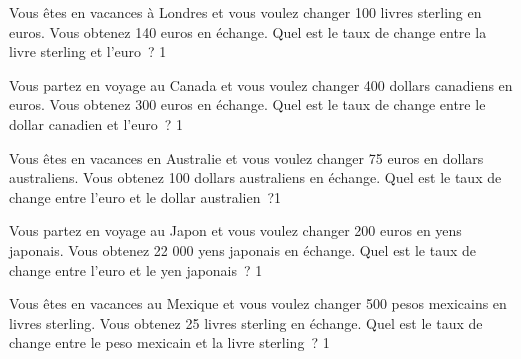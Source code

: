\documentclass[a4paper,11pt]{report}
\begin{document}
\begin{exo} %
{Vous êtes en vacances à Londres et vous voulez changer 100 livres sterling en euros. Vous obtenez 140 euros en échange. Quel est le taux de change entre la livre sterling et l'euro~?
\vspace{-0.2cm}
}{1}
\end{exo}


\begin{exo} %
{Vous partez en voyage au Canada et vous voulez changer 400 dollars canadiens en euros. Vous obtenez 300 euros en échange. Quel est le taux de change entre le dollar canadien et l'euro~?
\vspace{-0.2cm}
}{1}
\end{exo}

\begin{exo} %
{Vous êtes en vacances en Australie et vous voulez changer 75 euros en dollars australiens. Vous obtenez 100 dollars australiens en échange. Quel est le taux de change entre l'euro et le dollar australien~?}{1}
\end{exo}

\begin{exo} %
{Vous partez en voyage au Japon et vous voulez changer 200 euros en yens japonais. Vous obtenez 22 000 yens japonais en échange. Quel est le taux de change entre l'euro et le yen japonais~?
}{1}
\end{exo}

\begin{exo} %
{Vous êtes en vacances au Mexique et vous voulez changer 500 pesos mexicains en livres sterling. Vous obtenez 25 livres sterling en échange. Quel est le taux de change entre le peso mexicain et la livre sterling~?
}{1}
\end{exo}
\end{document}
